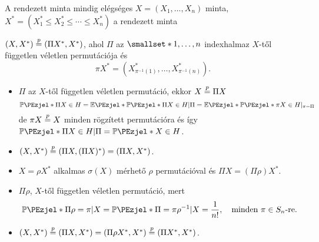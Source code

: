 \documentclass[aspectratio=169,notheorems,9pt,\option]{beamer}
\begin{document}
\begin{frame}{A rendezett minta mindig elégséges}
  $X=(X_1,\dots,X_n)$ minta, $X^*=(X_1^*\leq X_2^*\leq\cdots\leq X_n^*)$ a rendezett minta

  \begin{proposition}
    $(X,X^*)\stackrel{p}{=}(\Pi X^*,X^*)$, ahol $\Pi$ az $\smallset*{1,\dots,n}$ indexhalmaz 
    $X$-től független véletlen permutációja és 
    \begin{displaymath}
      \pi X^*=(X^*_{\pi^{-1}(1)},\dots,X^*_{\pi^{-1}(n)}).
    \end{displaymath}
  \end{proposition}
  
  \begin{itemize}
    \item $\Pi$ az $X$-től független véletlen permutáció, ekkor $X\stackrel{p}{=} \Pi X$
    \begin{displaymath}
      \P{\Pi X\in H}=\E{\P{\Pi X\in H|\Pi}}=\E{\P{\pi X\in H}|_{\pi=\Pi}}
    \end{displaymath} 
    de $\pi X\stackrel{p}{=} X$ minden rögzített permutációra és így $\P{\Pi X\in H|\Pi}=\P{X\in H}$.
    \item $(X,X^*)\stackrel{p}{=} (\Pi X,(\Pi X)^*)=(\Pi X,X^*)$.
    \item $X=\rho X^*$ alkalmas $\sigma(X)$ mérhető $\rho$ permutációval és 
    $\Pi X=(\Pi\rho) X^*$.
    \item $\Pi\rho$, $X$-től független véletlen permutáció, mert 
    \begin{displaymath}
      \P{\Pi\rho=\pi|X}=\P{\Pi=\pi\rho^{-1}|X}=\frac1{n!},
      \quad\text{minden $\pi\in S_n$-re}. 
    \end{displaymath}
    \item $(X,X^*)\stackrel{p}{=}(\Pi X,X^*)=(\Pi\rho X^*,X^*)\stackrel{p}{=}(\Pi X^*,X^*)$.
  \end{itemize}
\end{frame}


\end{document}
